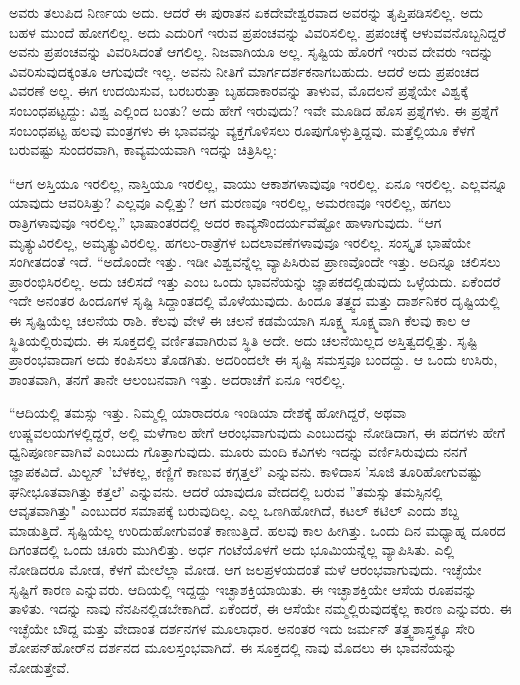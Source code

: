 ಅವರು ತಲುಪಿದ ನಿರ್ಣಯ ಅದು. ಆದರೆ ಈ ಪುರಾತನ ಏಕದೇವೇಶ್ವರವಾದ ಅವರನ್ನು ತೃಪ್ತಿಪಡಿಸಲಿಲ್ಲ. ಅದು ಬಹಳ ಮುಂದೆ ಹೋಗಲಿಲ್ಲ. ಅದು ಎದುರಿಗೆ ಇರುವ ಪ್ರಪಂಚವನ್ನು ವಿವರಿಸಲಿಲ್ಲ. ಪ್ರಪಂಚಕ್ಕೆ ಆಳುವವನೊಬ್ಬನಿದ್ದರೆ ಅವನು ಪ್ರಪಂಚವನ್ನು ವಿವರಿಸಿದಂತೆ ಆಗಲಿಲ್ಲ. ನಿಜವಾಗಿಯೂ ಅಲ್ಲ. ಸೃಷ್ಟಿಯ ಹೊರಗೆ ಇರುವ ದೇವರು ಇದನ್ನು ವಿವರಿಸುವುದಕ್ಕಂತೂ ಆಗುವುದೇ ಇಲ್ಲ. ಅವನು ನೀತಿಗೆ ಮಾರ್ಗದರ್ಶಕನಾಗಬಹುದು. ಆದರೆ ಅದು ಪ್ರಪಂಚದ ವಿವರಣೆ ಅಲ್ಲ. ಈಗ ಉದಯಿಸುವ, ಬರಬರುತ್ತಾ ಬೃಹದಾಕಾರವನ್ನು ತಾಳುವ, ಮೊದಲನೆ ಪ್ರಶ್ನೆಯೇ ವಿಶ್ವಕ್ಕೆ ಸಂಬಂಧಪಟ್ಟದ್ದು: ವಿಶ್ವ ಎಲ್ಲಿಂದ ಬಂತು? ಅದು ಹೇಗೆ ಇರುವುದು? ಇವೇ ಮೂಡಿದ ಹೊಸ ಪ್ರಶ್ನೆಗಳು. ಈ ಪ್ರಶ್ನೆಗೆ ಸಂಬಂಧಪಟ್ಟ ಹಲವು ಮಂತ್ರಗಳು ಈ ಭಾವವನ್ನು ವ್ಯಕ್ತಗೊಳಿಸಲು ರೂಪುಗೊಳ್ಳುತ್ತಿದ್ದವು. ಮತ್ತೆಲ್ಲಿಯೂ ಕೆಳಗೆ ಬರುವಷ್ಟು ಸುಂದರವಾಗಿ, ಕಾವ್ಯಮಯವಾಗಿ ಇದನ್ನು ಚಿತ್ರಿಸಿಲ್ಲ:

“ಆಗ ಅಸ್ತಿಯೂ ಇರಲಿಲ್ಲ, ನಾಸ್ತಿಯೂ ಇರಲಿಲ್ಲ, ವಾಯು ಆಕಾಶಗಳಾವುವೂ ಇರಲಿಲ್ಲ. ಏನೂ ಇರಲಿಲ್ಲ. ಎಲ್ಲವನ್ನೂ ಯಾವುದು ಆವರಿಸಿತ್ತು? ಎಲ್ಲವೂ ಎಲ್ಲಿತ್ತು? ಆಗ ಮರಣವೂ ಇರಲಿಲ್ಲ, ಅಮರಣವೂ ಇರಲಿಲ್ಲ, ಹಗಲು ರಾತ್ರಿಗಳಾವುವೂ ಇರಲಿಲ್ಲ.” ಭಾಷಾಂತರದಲ್ಲಿ ಅದರ ಕಾವ್ಯಸೌಂದರ್ಯವೆಷ್ಟೋ ಹಾಳಾಗುವುದು. “ಆಗ ಮೃತ್ಯುವಿರಲಿಲ್ಲ, ಅಮೃತ್ಯುವಿರಲಿಲ್ಲ. ಹಗಲು-ರಾತ್ರೆಗಳ ಬದಲಾವಣೆಗಳಾವುವೂ ಇರಲಿಲ್ಲ. ಸಂಸ್ಕೃತ ಭಾಷೆಯೇ ಸಂಗೀತದಂತೆ ಇದೆ. “ಅದೊಂದೇ ಇತ್ತು. ಇಡೀ ವಿಶ್ವವನ್ನೆಲ್ಲ ವ್ಯಾಪಿಸಿರುವ ಪ್ರಾಣವೊಂದೇ ಇತ್ತು. ಅದಿನ್ನೂ ಚಲಿಸಲು ಪ್ರಾರಂಭಿಸಿರಲಿಲ್ಲ. ಅದು ಚಲಿಸದೆ ಇತ್ತು ಎಂಬ ಒಂದು ಭಾವನೆಯನ್ನು ಜ್ಞಾಪಕದಲ್ಲಿಡುವುದು ಒಳ್ಳೆಯದು. ಏಕೆಂದರೆ ಇದೇ ಅನಂತರ ಹಿಂದೂಗಳ ಸೃಷ್ಟಿ ಸಿದ್ದಾಂತದಲ್ಲಿ ಮೊಳೆಯುವುದು. ಹಿಂದೂ ತತ್ತ್ವದ ಮತ್ತು ದಾರ್ಶನಿಕರ ದೃಷ್ಟಿಯಲ್ಲಿ ಈ ಸೃಷ್ಟಿಯೆಲ್ಲ ಚಲನೆಯ ರಾಶಿ. ಕೆಲವು ವೇಳೆ ಈ ಚಲನೆ ಕಡಮೆಯಾಗಿ ಸೂಕ್ಷ್ಮ ಸೂಕ್ಷ್ಮವಾಗಿ ಕೆಲವು ಕಾಲ ಆ ಸ್ಥಿತಿಯಲ್ಲಿರುವುದು. ಈ ಸೂಕ್ತದಲ್ಲಿ ವರ್ಣಿತವಾಗಿರುವ ಸ್ಥಿತಿ ಅದೇ. ಅದು ಚಲನೆಯಿಲ್ಲದ ಅಸ್ತಿತ್ವದಲ್ಲಿತ್ತು. ಸೃಷ್ಟಿ ಪ್ರಾರಂಭವಾದಾಗ ಅದು ಕಂಪಿಸಲು ತೊಡಗಿತು. ಅದರಿಂದಲೇ ಈ ಸೃಷ್ಟಿ ಸಮಸ್ತವೂ ಬಂದದ್ದು. ಆ ಒಂದು ಉಸಿರು, ಶಾಂತವಾಗಿ, ತನಗೆ ತಾನೇ ಆಲಂಬನವಾಗಿ ಇತ್ತು. ಅದರಾಚೆಗೆ ಏನೂ ಇರಲಿಲ್ಲ.

“ಆದಿಯಲ್ಲಿ ತಮಸ್ಸು ಇತ್ತು. ನಿಮ್ಮಲ್ಲಿ ಯಾರಾದರೂ ಇಂಡಿಯಾ ದೇಶಕ್ಕೆ ಹೋಗಿದ್ದರೆ, ಅಥವಾ ಉಷ್ಣವಲಯಗಳಲ್ಲಿದ್ದರೆ, ಅಲ್ಲಿ ಮಳೆಗಾಲ ಹೇಗೆ ಆರಂಭವಾಗುವುದು ಎಂಬುದನ್ನು ನೋಡಿದಾಗ, ಈ ಪದಗಳು ಹೇಗೆ ಧ್ವನಿಪೂರ್ಣವಾಗಿವೆ ಎಂಬುದು ಗೊತ್ತಾಗುವುದು. ಮೂರು ಮಂದಿ ಕವಿಗಳು ಇದನ್ನು ವರ್ಣಿಸಿರುವುದು ನನಗೆ ಜ್ಞಾಪಕವಿದೆ. ಮಿಲ್ಟನ್  'ಬೆಳಕಲ್ಲ, ಕಣ್ಣಿಗೆ ಕಾಣುವ ಕಗ್ಗತ್ತಲೆ' ಎನ್ನುವನು. ಕಾಳಿದಾಸ 'ಸೂಜಿ ತೂರಿಹೋಗುವಷ್ಟು ಘನೀಭೂತವಾಗಿತ್ತು ಕತ್ತಲೆ' ಎನ್ನುವನು. ಆದರೆ ಯಾವುದೂ ವೇದದಲ್ಲಿ ಬರುವ ''ತಮಸ್ಸು ತಮಸ್ಸಿನಲ್ಲಿ ಆವೃತವಾಗಿತ್ತು" ಎಂಬುದರ ಸಮಾಪಕ್ಕೆ ಬರುವುದಿಲ್ಲ. ಎಲ್ಲ ಒಣಗಿಹೋಗಿದೆ, ಕಟಲ್ ಕಟಿಲ್ ಎಂದು ಶಬ್ದ ಮಾಡುತ್ತಿದೆ. ಸೃಷ್ಟಿಯೆಲ್ಲ ಉರಿದುಹೋಗುವಂತೆ ಕಾಣುತ್ತಿದೆ. ಹಲವು ಕಾಲ ಹೀಗಿತ್ತು. ಒಂದು ದಿನ ಮಧ್ಯಾಹ್ನ ದೂರದ ದಿಗಂತದಲ್ಲಿ ಒಂದು ಚೂರು ಮುಗಿಲಿತ್ತು. ಅರ್ಧ ಗಂಟೆಯೊಳಗೆ ಅದು ಭೂಮಿಯನ್ನೆಲ್ಲ ವ್ಯಾಪಿಸಿತು. ಎಲ್ಲಿ ನೋಡಿದರೂ ಮೋಡ, ಕೆಳಗೆ ಮೇಲೆಲ್ಲಾ ಮೋಡ. ಆಗ ಜಲಪ್ರಳಯದಂತೆ ಮಳೆ ಆರಂಭವಾಗುವುದು. ಇಚ್ಛೆಯೇ ಸೃಷ್ಟಿಗೆ ಕಾರಣ ಎನ್ನುವರು. ಆದಿಯಲ್ಲಿ ಇದ್ದದ್ದು ಇಚ್ಛಾಶಕ್ತಿಯಾಯಿತು. ಈ ಇಚ್ಛಾಶಕ್ತಿಯೇ ಆಸೆಯ ರೂಪವನ್ನು ತಾಳಿತು. ಇದನ್ನು ನಾವು ನೆನಪಿನಲ್ಲಿಡಬೇಕಾಗಿದೆ. ಏಕೆಂದರೆ, ಈ ಆಸೆಯೇ ನಮ್ಮಲ್ಲಿರುವುದಕ್ಕೆಲ್ಲ ಕಾರಣ ಎನ್ನುವರು. ಈ ಇಚ್ಛೆಯೇ ಬೌದ್ದ ಮತ್ತು ವೇದಾಂತ ದರ್ಶನಗಳ ಮೂಲಾಧಾರ. ಅನಂತರ ಇದು ಜರ್ಮನ್ ತತ್ತ್ವಶಾಸ್ತ್ರಕ್ಕೂ ಸೇರಿ ಶೋಪನ್‌ಹೋರ್‌ನ ದರ್ಶನದ ಮೂಲಸ್ತಂಭವಾಗಿದೆ. ಈ ಸೂಕ್ತದಲ್ಲಿ ನಾವು ಮೊದಲು ಈ ಭಾವನೆಯನ್ನು ನೋಡುತ್ತೇವೆ.


